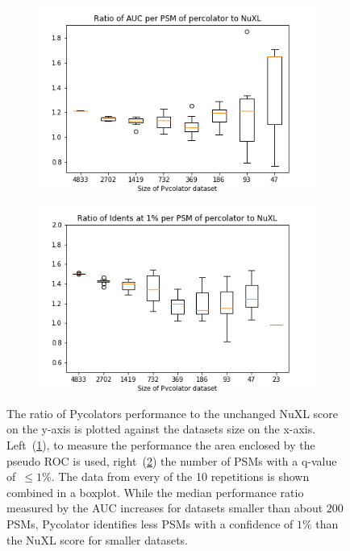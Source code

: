 \begin{figure}
	\normalsize
	\centering
	\begin{subfigure}{0.49 \textwidth}
		\includegraphics[width = \textwidth]{figures/auc_p_vs_ori.png}
		\caption{}
		\label{fig:results:small_dataset_snd_comparison_auc}
	\end{subfigure}
	\hfill
	\begin{subfigure}{0.49 \textwidth}
		\includegraphics[width = \textwidth]{figures/idents_p_vs_ori_zoomed.png}
		\caption{}
		\label{fig:results:small_dataset_snd_comparison_idents}
	\end{subfigure}
	\caption[Performance of Pycolator on smaller datasets]{The ratio of Pycolators performance to the unchanged NuXL score on the y-axis is plotted against the datasets size on the x-axis. Left~(\ref{fig:results:small_dataset_snd_comparison_auc}), to measure the performance the area enclosed by the pseudo ROC is used, right~(\ref{fig:results:small_dataset_snd_comparison_idents}) the number of PSMs with a q-value of~$\leq1\%$. The data from every of the 10 repetitions is shown combined in a boxplot. While the median performance ratio measured by the AUC increases for datasets smaller than about $200$ PSMs, Pycolator identifies less PSMs with a confidence of $1\%$ than the NuXL score for smaller datasets.}
	\label{fig:results:small_dataset_snd_comparison}
\end{figure}
\renewcommand{\baselinestretch}{1}
	